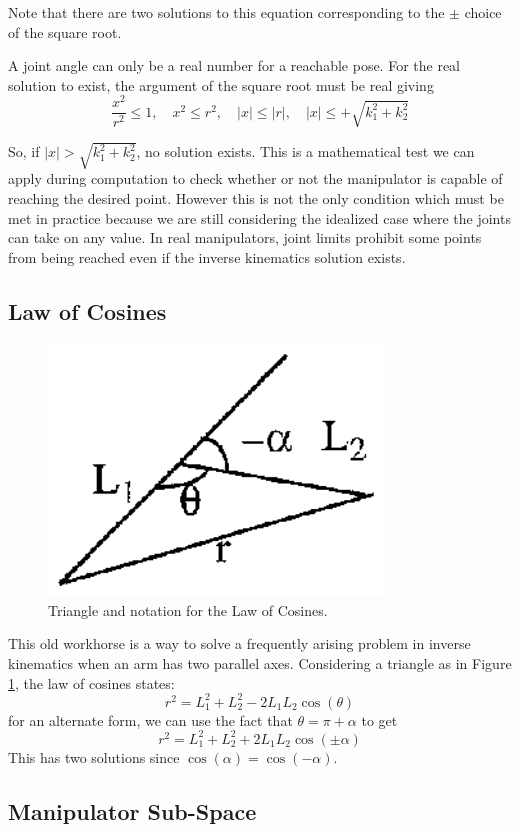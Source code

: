 Note that there are two solutions to this equation corresponding to the $\pm$ choice of the square root.

A  joint angle can only be a real number for a reachable pose.  For the real solution to exist, the argument of the square root must be real giving
\[
\frac{x^2}{r^2}\leq 1, \quad x^2 \leq r^2, \quad |x| \leq |r|, \quad |x| \leq +\sqrt{k_1^2+k_2^2}
\]

So, if $|x| > \sqrt{k_1^2+k_2^2}$, no solution exists.  This is a mathematical test we can apply during computation to check whether or not the manipulator is capable of reaching the desired point.   However this is not the only condition which must be met in practice because we are still considering the idealized case where the joints can take on any value. In real manipulators, joint limits prohibit some points from being reached even if the inverse kinematics solution exists.


\subsection{Law of Cosines}

\begin{figure}\centering
\includegraphics[width=3.5in]{figs04/00436.eps}
\caption{Triangle and notation for the Law of Cosines.}\label{LOC}
\end{figure}

This old workhorse is a way to solve a frequently arising problem in inverse kinematics when an arm has two parallel axes.  Considering a triangle as in Figure \ref{LOC}, the law of cosines states:
\[
r^2 = L_1^2+L_2^2-2L_1L_2\cos(\theta)
\]
for an alternate form, we can use the fact that  $\theta = \pi + \alpha$ to get
\[
r^2 = L_1^2 + L_2^2 + 2L_1L_2\cos(\pm \alpha)
\]
This has two solutions since $\cos(\alpha) = \cos(-\alpha)$.


\subsection{Manipulator Sub-Space}

